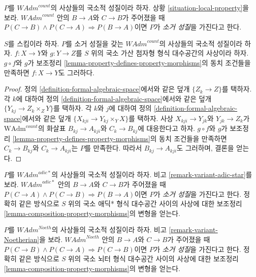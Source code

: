 \begin{situation}
\label{situation-permanence-local-property}
$P$를 $\textit{WAdm}^{count}$의 사상들의 국소적 성질이라 하자.
상황 \ref{situation-local-property}을 보라.
$\textit{WAdm}^{count}$ 안의 $B \to A$와 $C \to B$가 주어졌을 때
$P(C \to B) \wedge P(C \to A) \Rightarrow P(B \to A)$이면
$P$가 {\it 소거 성질}을 가진다고 한다.
\end{situation}

\begin{lemma}
\label{lemma-permanence-property-morphisms}
$S$를 스킴이라 하자. $P$를 소거 성질을 갖는
$\textit{WAdm}^{count}$의 사상들의 국소적 성질이라 하자.
$f : X \to Y$와 $g : Y \to Z$를 $S$ 위의 국소 가산 첨자형 형식
대수공간의 사상이라 하자. $g \circ f$와 $g$가 보조정리 %
\ref{lemma-property-defines-property-morphisms}의 동치 조건들을
만족하면 $f : X \to Y$도 그러하다.
\end{lemma}

\begin{proof}
정의 \ref{definition-formal-algebraic-space}에서와 같은 덮개
$\{Z_k \to Z\}$를 택하자. 각 $k$에 대하여 정의
\ref{definition-formal-algebraic-space}에서와 같은 덮개
$\{Y_{kj} \to Z_k \times_Z Y\}$를 택하자. 각 $k$와 $j$에 대하여
정의 \ref{definition-formal-algebraic-space}에서와 같은 덮개
$\{X_{kji} \to Y_{kj} \times_Y X\}$를 택하자. 사상
$X_{kji} \to Y_{jk}$와 $Y_{jk} \to Z_k$가 %
$\text{WAdm}^{count}$의 화살표 $B_{kj} \to A_{kji}$와
$C_k \to B_{kj}$에 대응한다고 하자. $g \circ f$와 $g$가 %
보조정리 \ref{lemma-property-defines-property-morphisms}의 동치
조건들을 만족하면 $C_k \to B_{kj}$와 $C_k \to A_{kji}$는
$P$를 만족한다. 따라서 $B_{kj} \to A_{kji}$도 그러하며, 결론을
얻는다.
\end{proof}

\begin{remark}[애딕* 변형]
\label{remark-permanence-variant-adic-star}
$P$를 $\textit{WAdm}^{adic*}$의 사상들의 국소적 성질이라 하자.
비고 \ref{remark-variant-adic-star}를 보라.
$\textit{WAdm}^{adic*}$ 안의 $B \to A$와 $C \to B$가 주어졌을 때
$P(C \to A) \wedge P(C \to B) \Rightarrow P(B \to A)$이면
$P$가 {\it 소거 성질}을 가진다고 한다. 정확히 같은 방식으로
$S$ 위의 국소 애딕* 형식 대수공간 사이의 사상에 대한 보조정리
\ref{lemma-composition-property-morphisms}의 변형을 얻는다. %
\end{remark}

\begin{remark}[뇌터 변형]
\label{remark-permanence-variant-Noetherian}
$P$를 $\textit{WAdm}^{Noeth}$의 사상들의 국소적 성질이라 하자.
비고 \ref{remark-variant-Noetherian}을 보라.
$\textit{WAdm}^{Noeth}$ 안의 $B \to A$와 $C \to B$가 주어졌을 때
$P(C \to B) \wedge P(C \to A) \Rightarrow P(C \to B)$이면 %
$P$가 {\it 소거 성질}을 가진다고 한다. 정확히 같은 방식으로
$S$ 위의 국소 뇌터 형식 대수공간 사이의 사상에 대한 보조정리
\ref{lemma-composition-property-morphisms}의 변형을 얻는다. %
\end{remark}


